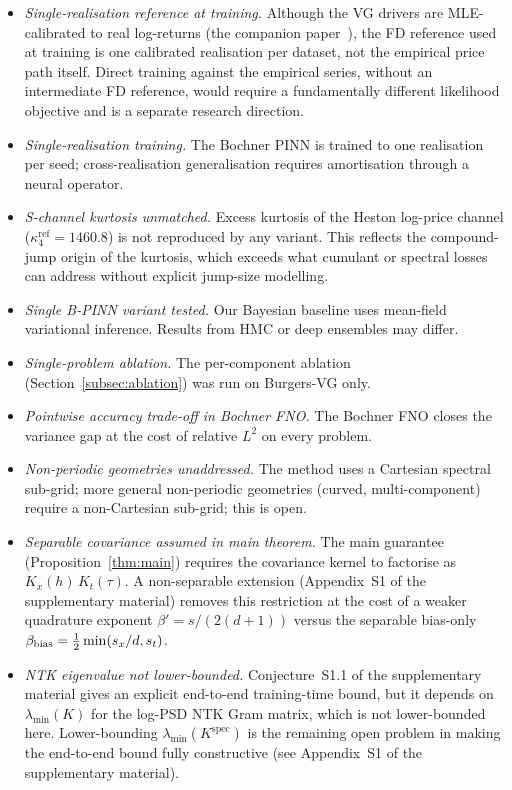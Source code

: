 \documentclass[10pt]{elsarticle}
\begin{document}
\begin{itemize}
\item \emph{Single-realisation reference at training.} Although the
VG drivers are MLE-calibrated to real log-returns
(the companion paper~\citep{Lipski2026RealWorld}), the FD reference used at training is
one calibrated realisation per dataset, not the empirical price path
itself. Direct training against the empirical series, without an
intermediate FD reference, would require a fundamentally different
likelihood objective and is a separate research direction.
\item \emph{Single-realisation training.} The Bochner PINN is
trained to one realisation per seed; cross-realisation
generalisation requires amortisation through a neural operator.
\item \emph{S-channel kurtosis unmatched.} Excess kurtosis of
the Heston log-price channel (\(\kappa_4^{\mathrm{ref}} = 1460.8\))
is not reproduced by any variant. This reflects the compound-jump
origin of the kurtosis, which exceeds what cumulant or spectral
losses can address without explicit jump-size modelling.
\item \emph{Single B-PINN variant tested.} Our Bayesian baseline
uses mean-field variational inference. Results from HMC or deep
ensembles may differ.
\item \emph{Single-problem ablation.} The per-component ablation
(Section~\ref{subsec:ablation}) was run on Burgers-VG only.
\item \emph{Pointwise accuracy trade-off in Bochner FNO.} The
Bochner FNO closes the variance gap at the cost of relative
$L^2$ on every problem.
\item \emph{Non-periodic geometries unaddressed.} The method uses a Cartesian spectral sub-grid; more general non-periodic geometries (curved, multi-component) require a non-Cartesian sub-grid; this is open.
\item \emph{Separable covariance assumed in main theorem.} The main
guarantee (Proposition~\ref{thm:main}) requires the covariance kernel
to factorise as $K_x(h)\,K_t(\tau)$. A non-separable extension
(Appendix~S1 of the supplementary material)
removes this restriction at the cost of a weaker quadrature exponent
$\beta'=s/(2(d+1))$ versus the separable bias-only
$\beta_{\rm bias}=\tfrac{1}{2}\min(s_x/d,s_t)$.
\item \emph{NTK eigenvalue not lower-bounded.}
Conjecture~S1.1 of the supplementary material gives an explicit end-to-end training-time
bound, but it depends on $\lambda_{\min}(K)$ for the log-PSD NTK Gram
matrix, which is not lower-bounded here. Lower-bounding
$\lambda_{\min}(K^{\mathrm{spec}})$ is the remaining open problem
in making the end-to-end bound fully constructive
(see Appendix~S1 of the supplementary material).
\end{itemize}
\end{document}
